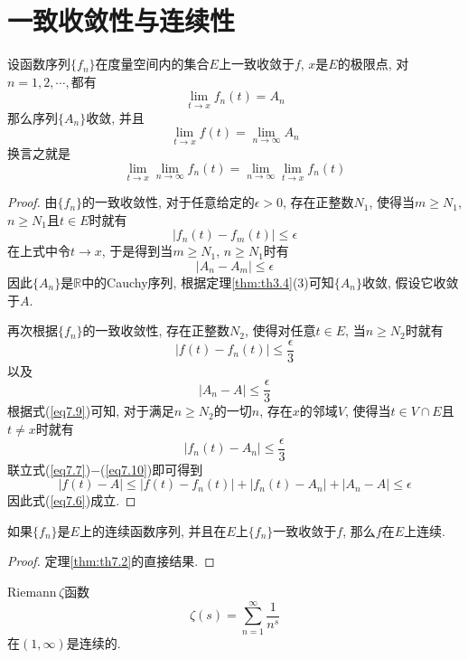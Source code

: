 \documentclass[cn,12pt,math=mtpro2,citestyle=gb7714-2015,bibstyle=gb7714-2015,twocol]{elegantbook}
\newcommand{\R}{\mathbb{R}}
\newcommand{\limn}{\lim_{n\to\infty}}
\begin{document}
\section{一致收敛性与连续性}
\begin{theorem}\label{thm:th7.2}
  设函数序列$\{f_n\}$在度量空间内的集合$E$上一致收敛于$f$, $x$是$E$的极限点, 对$n=1,2,\cdots,$都有
  \begin{equation}\label{eq7.9}
    \lim_{t\to x}f_n(t)=A_n
  \end{equation}
  那么序列$\{A_n\}$收敛, 并且
  \begin{equation}\label{eq7.6}
    \lim_{t\to x}f(t)=\limn A_n
  \end{equation}
  换言之就是
  $$\lim_{t\to x}\limn f_n(t)=\limn \lim_{t\to x}f_n(t)$$
\end{theorem}
\begin{proof}
  由$\{f_n\}$的一致收敛性, 对于任意给定的$\epsilon>0$, 存在正整数$N_1$, 使得当$m\geq N_1$, $n\geq N_1$且$t\in E$时就有
  $$|f_n(t)-f_m(t)|\leq\epsilon$$
  在上式中令$t\to x$, 于是得到当$m\geq N_1$, $n\geq N_1$时有
  $$|A_n-A_m|\leq\epsilon$$
  因此$\{A_n\}$是$\R$中的Cauchy序列, 根据定理\ref{thm:th3.4}(3)可知$\{A_n\}$收敛, 假设它收敛于$A$.

  再次根据$\{f_n\}$的一致收敛性, 存在正整数$N_2$, 使得对任意$t\in E$, 当$n\geq N_2$时就有
  \begin{equation}\label{eq7.7}
    |f(t)-f_n(t)|\leq\frac{\epsilon}{3}
  \end{equation}
  以及
  \begin{equation}\label{eq7.8}
    |A_n-A|\leq\frac{\epsilon}{3}
  \end{equation}
  根据式(\ref{eq7.9})可知, 对于满足$n\geq N_2$的一切$n$, 存在$x$的邻域$V$, 使得当$t\in V\cap E$且$t\neq x$时就有
  \begin{equation}\label{eq7.10}
    |f_n(t)-A_n|\leq\frac{\epsilon}{3}
  \end{equation}
  联立式(\ref{eq7.7})$-$(\ref{eq7.10})即可得到
  $$|f(t)-A|\leq|f(t)-f_n(t)|+|f_n(t)-A_n|+|A_n-A|\leq\epsilon$$
  因此式(\ref{eq7.6})成立.

\end{proof}
\begin{theorem}\label{thm:th7.3}
如果$\{f_n\}$是$E$上的连续函数序列, 并且在$E$上$\{f_n\}$一致收敛于$f$, 那么$f$在$E$上连续.
\end{theorem}
\begin{proof}
定理\ref{thm:th7.2}的直接结果.
\end{proof}
\begin{example}
Riemann$\,\zeta$函数
$$\zeta(s)=\sum_{n=1}^{\infty}\frac{1}{n^s}$$
在$(1,\infty)$是连续的.
\end{example}
\end{document}
